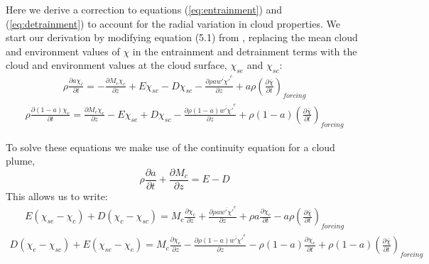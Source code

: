\documentclass[draft,grl]{AGUTeX}
\begin{document}
\begin{article}
Here we derive a correction to equations 
(\ref{eq:entrainment}) and (\ref{eq:detrainment}) to account for the radial 
variation in cloud properties. We start our derivation by modifying equation 
(5.1) from \cite{Siebesma1995}, replacing the mean cloud and environment values 
of $\chi$ in the entrainment and detrainment terms with the cloud and 
environment values at the cloud surface, $\chi_{se}$ and $\chi_{sc}$:
\begin{eqnarray}
  \label{eq:derivation_entrainment}
    \rho \frac{\partial a \chi_c}{\partial t} 
    = - \frac{\partial M_c \chi_c}{\partial z} 
    + E \chi_{se} - D \chi_{sc} 
    - \frac{\partial \rho a \overline{w' \chi'}^c}{\partial z} 
    + a \rho \left(\frac{\partial \bar{\chi}}{\partial t}\right)_{forcing}
\end{eqnarray}
\begin{eqnarray}
  \label{eq:derivation_detrainment}
    \rho \frac{\partial (1 - a) \chi_e}{\partial t}
    = \frac{\partial M_c \chi_e}{\partial z} 
    - E \chi_{se} + D \chi_{sc} 
    - \frac{\partial \rho (1 - a) \overline{w' \chi'}^e}{\partial z} 
    + \rho (1 - a) \left(\frac{\partial \bar{\chi}}{\partial t}\right)_{forcing}
\end{eqnarray}

To solve these equations we make use of the continuity equation for a cloud 
plume,
\begin{equation}
   \label{eq:continuity}
   \rho \frac{\partial a}{\partial t} + \frac{\partial M_c}{\partial z} = E - D
\end{equation}
This allows us to write:
\begin{eqnarray}
  \label{eq:entrainment_2}
    E (\chi_{se} - \chi_c) + D (\chi_c - \chi_{sc}) 
    = M_c \frac{\partial \chi_c}{\partial z}
    + \frac{\partial \rho a \overline{w' \chi'}^c}{\partial z} 
    + \rho a \frac{\partial \chi_c}{\partial t}
    - a \rho \left(\frac{\partial \bar{\chi}}{\partial t}\right)_{forcing}
\end{eqnarray}
\begin{eqnarray}
  \label{eq:detrainment_2}
    D (\chi_e - \chi_{sc}) + E (\chi_{se} - \chi_e)
    = M_c \frac{\partial \chi_e}{\partial z}
    - \frac{\partial \rho (1 - a) \overline{w' \chi'}^e}{\partial z} 
    - \rho (1 - a) \frac{\partial \chi_e}{\partial t}
    + \rho (1 - a) \left(\frac{\partial \bar{\chi}}{\partial t}\right)_{forcing}
\end{eqnarray}


\end{article}
\end{document}
